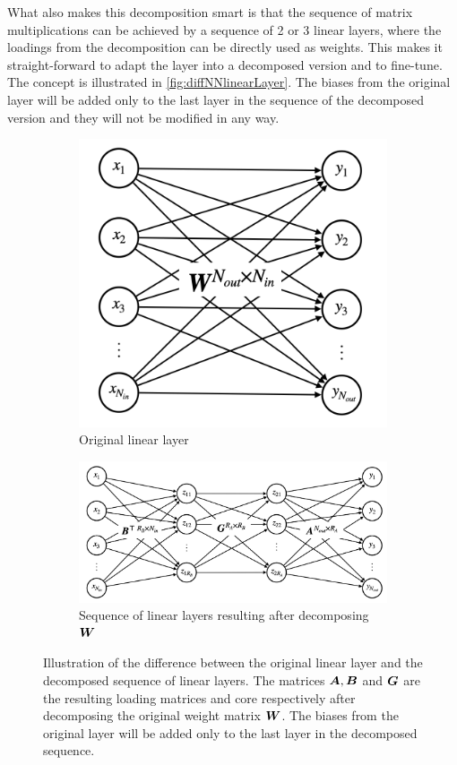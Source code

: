 What also makes this decomposition smart is that the sequence of matrix multiplications can be achieved by a sequence of 2 or 3 linear layers, where the loadings from the decomposition can be directly used as weights. This makes it straight-forward to adapt the layer into a decomposed version and to fine-tune. The concept is illustrated in \autoref{fig:diffNNlinearLayer}. The biases from the original layer will be added only to the last layer in the sequence of the decomposed version and they will not be modified in any way.
\begin{figure}
    \centering
    \begin{subfigure}{0.35\linewidth}
        \centering
        \includegraphics[width=\linewidth]{Pics/05_methodology/NNlinearLayer.png}
        \caption{Original linear layer}
    \end{subfigure}
    \begin{subfigure}{\linewidth}
        \centering
        \includegraphics[width=.7\linewidth]{Pics/05_methodology/NNdecompLinearLayer.png}
        \caption{Sequence of linear layers resulting after decomposing $\boldsymbol{W}$}
    \end{subfigure}
    \captionsetup{width=.9\linewidth}
    \caption{Illustration of the difference between the original linear layer and the decomposed sequence of linear layers. The matrices $\boldsymbol{A}, \boldsymbol{B}$ and $\boldsymbol{G}$ are the resulting loading matrices and core respectively after decomposing the original weight matrix $\boldsymbol{W}$. The biases from the original layer will be added only to the last layer in the decomposed sequence.}
    \label{fig:diffNNlinearLayer}
\end{figure}


